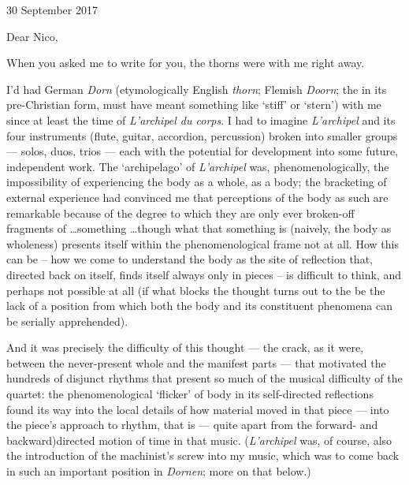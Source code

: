 \documentclass[11pt]{article}
\author{}
\date{}
\begin{document}
{} 
\thispagestyle{empty}
\setlength{\parindent}{0cm}

30 September 2017

Dear Nico,

When you asked me to write for you, the thorns were with me right away.

I'd had German \textit{Dorn} (etymologically English \textit{thorn}; Flemish \textit{Doorn}; the in its pre-Christian form, must have meant something like `stiff' or `stern') with me since at least the time of \textit{L'archipel du corps}. I had to imagine \textit{L'archipel} and its four instruments (flute, guitar, accordion, percussion) broken into smaller groups --- solos, duos, trios --- each with the potential for development into some future, independent work. The `archipelago' of \textit{L'archipel} was, phenomenologically, the impossibility of experiencing the body as a whole, as a body; the bracketing of external experience had convinced me that perceptions of the body as such are remarkable because of the degree to which they are only ever broken-off fragments of \dots something \dots though what that something is (naively, the body as wholeness) presents itself within the phenomenological frame not at all. How this can be -- how we come to understand the body as the site of reflection that, directed back on itself, finds itself always only in pieces -- is difficult to think, and perhaps not possible at all (if what blocks the thought turns out to the be the lack of a position from which both the body and its constituent phenomena can be serially apprehended).

And it was precisely the difficulty of this thought --- the crack, as it were, between the never-present whole and the manifest parts --- that motivated the hundreds of disjunct rhythms that present so much of the musical difficulty of the quartet: the phenomenological `flicker' of body in its self-directed reflections found its way into the local details of how material moved in that piece --- into the piece's approach to rhythm, that is --- quite apart from the forward- and backward)directed motion of time in that music. (\textit{L'archipel} was, of course, also the introduction of the machinist's screw into my music, which was to come back in such an important position in \textit{Dornen}; more on that below.)
\end{document}
